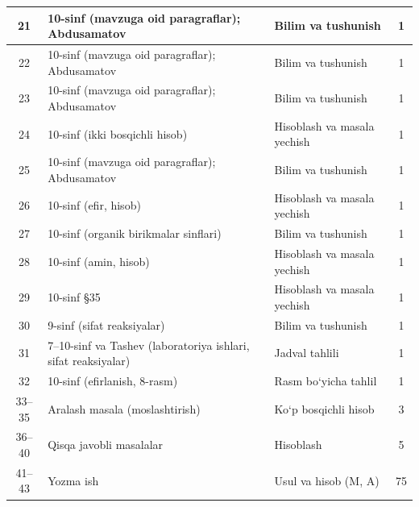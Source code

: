 \documentclass[11pt,a4paper]{article}
\begin{document}
{\begin{longtable}{|c|p{7.2cm}|p{5.4cm}|c|}
21 & 10-sinf (mavzuga oid paragraflar); Abdusamatov & Bilim va tushunish & 1\\\hline
22 & 10-sinf (mavzuga oid paragraflar); Abdusamatov & Bilim va tushunish & 1\\\hline
23 & 10-sinf (mavzuga oid paragraflar); Abdusamatov & Bilim va tushunish & 1\\\hline
24 & 10-sinf (ikki bosqichli hisob) & Hisoblash va masala yechish & 1\\\hline
25 & 10-sinf (mavzuga oid paragraflar); Abdusamatov & Bilim va tushunish & 1\\\hline
26 & 10-sinf (efir, hisob) & Hisoblash va masala yechish & 1\\\hline
27 & 10-sinf (organik birikmalar sinflari) & Bilim va tushunish & 1\\\hline
28 & 10-sinf (amin, hisob) & Hisoblash va masala yechish & 1\\\hline
29 & 10-sinf \S{}35 & Hisoblash va masala yechish & 1\\\hline
30 & 9-sinf (sifat reaksiyalar) & Bilim va tushunish & 1\\\hline
31 & 7--10-sinf va Tashev (laboratoriya ishlari, sifat reaksiyalar) & Jadval tahlili & 1\\\hline
32 & 10-sinf (efirlanish, 8-rasm) & Rasm bo`yicha tahlil & 1\\\hline
33--35 & Aralash masala (moslashtirish) & Ko`p bosqichli hisob & 3\\\hline
36--40 & Qisqa javobli masalalar & Hisoblash & 5\\\hline
41--43 & Yozma ish & Usul va hisob (M, A) & 75\\\hline
\end{longtable}}
\end{document}
